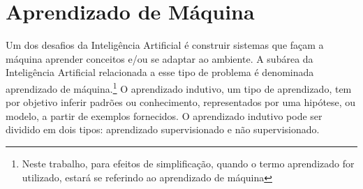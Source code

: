 

\chapter{Aprendizado de Máquina}
\thispagestyle{empty} %
\label{chapter:aprendizadomaquina}

Um dos desafios da Inteligência Artificial é construir sistemas que façam a máquina aprender conceitos e/ou se adaptar ao ambiente. A subárea da Inteligência Artificial relacionada a esse tipo de problema é denominada aprendizado de máquina.\footnote{Neste trabalho, para efeitos de simplificação, quando o termo aprendizado for utilizado, estará se referindo ao aprendizado de máquina} O aprendizado indutivo, um tipo de aprendizado, tem por objetivo inferir padrões ou conhecimento, representados por uma hipótese, ou modelo, a partir de exemplos fornecidos. O aprendizado indutivo pode ser dividido em dois tipos: aprendizado supervisionado e não supervisionado.

